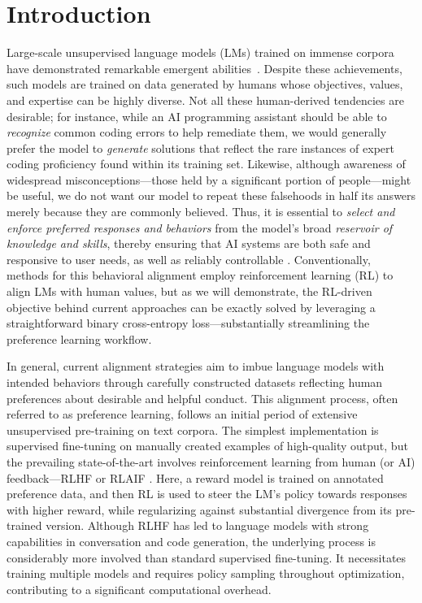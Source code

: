 \section{Introduction}
Large-scale unsupervised language models (LMs) trained on immense corpora have demonstrated remarkable emergent abilities~\citep{chowdhery2022palm, brown2020language, touvron2023llama,bubeck2023sparks}. Despite these achievements, such models are trained on data generated by humans whose objectives, values, and expertise can be highly diverse. Not all these human-derived tendencies are desirable; for instance, while an AI programming assistant should be able to \textit{recognize} common coding errors to help remediate them, we would generally prefer the model to \emph{generate} solutions that reflect the rare instances of expert coding proficiency found within its training set. Likewise, although awareness of widespread misconceptions—those held by a significant portion of people—might be useful, we do not want our model to repeat these falsehoods in half its answers merely because they are commonly believed. Thus, it is essential to \emph{select and enforce preferred responses and behaviors} from the model’s broad \textit{reservoir of knowledge and skills}, thereby ensuring that AI systems are both safe and responsive to user needs, as well as reliably controllable \citep{ouyang2022training}. Conventionally, methods for this behavioral alignment employ reinforcement learning (RL) to align LMs with human values, but as we will demonstrate, the RL-driven objective behind current approaches can be exactly solved by leveraging a straightforward binary cross-entropy loss—substantially streamlining the preference learning workflow.

In general, current alignment strategies aim to imbue language models with intended behaviors through carefully constructed datasets reflecting human preferences about desirable and helpful conduct. This alignment process, often referred to as preference learning, follows an initial period of extensive unsupervised pre-training on text corpora. The simplest implementation is supervised fine-tuning on manually created examples of high-quality output, but the prevailing state-of-the-art involves reinforcement learning from human (or AI) feedback—RLHF or RLAIF \citep{christiano2017deep,bai2022constitutional}. Here, a reward model is trained on annotated preference data, and then RL is used to steer the LM’s policy towards responses with higher reward, while regularizing against substantial divergence from its pre-trained version. Although RLHF has led to language models with strong capabilities in conversation and code generation, the underlying process is considerably more involved than standard supervised fine-tuning. It necessitates training multiple models and requires policy sampling throughout optimization, contributing to a significant computational overhead.


